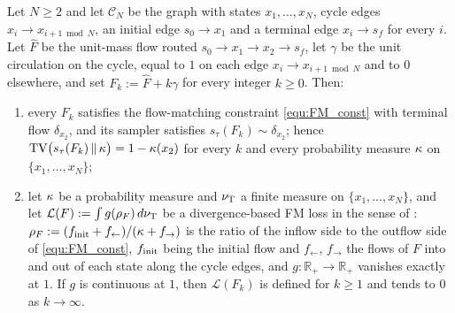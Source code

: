 \begin{lemma}\label{lem:cycle_counterexample}
Let $N\geq2$ and let $\mathcal C_N$ be the graph with states $x_1,\dots,x_N$, cycle edges $x_i\rightarrow x_{i+1 \bmod N}$, an initial edge $s_0\rightarrow x_1$ and a terminal edge $x_i\rightarrow s_f$ for every $i$. Let $\widehat F$ be the unit-mass flow routed $s_0\rightarrow x_1\rightarrow x_2\rightarrow s_f$, let $\gamma$ be the unit circulation on the cycle, equal to $1$ on each edge $x_i\rightarrow x_{i+1\bmod N}$ and to $0$ elsewhere, and set $F_k:=\widehat F+k\gamma$ for every integer $k\geq0$. Then:
\begin{enumerate}
    \item every $F_k$ satisfies the flow-matching constraint \eqref{equ:FM_const} with terminal flow $\delta_{x_2}$, and its sampler satisfies $s_\tau(F_k)\sim\delta_{x_2}$; hence $\mathrm{TV}\bigl(s_\tau(F_k)\,\|\,\kappa\bigr)=1-\kappa(x_2)$ for every $k$ and every probability measure $\kappa$ on $\{x_1,\dots,x_N\}$;
    \item let $\kappa$ be a probability measure and $\nu_{\mathrm{T}}$ a finite measure on $\{x_1,\dots,x_N\}$, and let $\mathcal L(F):=\int g(\rho_F)\,d\nu_{\mathrm{T}}$ be a divergence-based FM loss in the sense of \citet[\S4.1]{brunswic2024theory}: $\rho_F:=(f_{\mathrm{init}}+f_\leftarrow)/(\kappa+f_\rightarrow)$ is the ratio of the inflow side to the outflow side of \eqref{equ:FM_const}, $f_{\mathrm{init}}$ being the initial flow and $f_\leftarrow$, $f_\rightarrow$ the flows of $F$ into and out of each state along the cycle edges, and $g:\mathbb R_+\rightarrow\mathbb R_+$ vanishes exactly at $1$. If $g$ is continuous at $1$, then $\mathcal L(F_k)$ is defined for $k\geq1$ and tends to $0$ as $k\rightarrow\infty$.
\end{enumerate}
\end{lemma}

